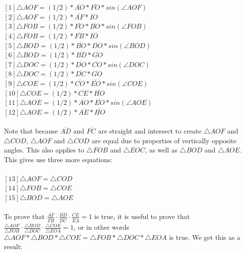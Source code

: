 \begin{Questions}
{  \\
  \\$[1]\triangle AOF = (1/2)*\overline{AO}*\overline{FO}*sin(\angle AOF)$
  \\$[2]\triangle AOF = (1/2)*\overline{AF}*\overline{IO}$
  \\$[3]\triangle FOB = (1/2)*\overline{FO}*\overline{BO}*sin(\angle FOB)$
  \\$[4]\triangle FOB = (1/2)*\overline{FB}*\overline{IO}$
  \\$[5]\triangle BOD = (1/2)*\overline{BO}*\overline{DO}*sin(\angle BOD)$
  \\$[6]\triangle BOD = (1/2)*\overline{BD}*\overline{GO}$  \\$[7]\triangle DOC = (1/2)*\overline{DO}*\overline{CO}*sin(\angle DOC)$
  \\$[8]\triangle DOC = (1/2)*\overline{DC}*\overline{GO}$  \\$[9]\triangle COE = (1/2)*\overline{CO}*\overline{EO}*sin(\angle COE)$
  \\$[10]\triangle COE = (1/2)*\overline{CE}*\overline{HO}$
  \\$[11]\triangle AOE = (1/2)*\overline{AO}*\overline{EO}*sin(\angle AOE)$
  \\$[12]\triangle AOE = (1/2)*\overline{AE}*\overline{HO}$
  \\
  \\Note that because $\overline{AD}$ and $\overline{FC}$ are straight and intersect to create $\triangle AOF$ and $\triangle COD$, $\triangle AOF$ and $\triangle COD$ are equal due to properties of vertically opposite angles. This also applies to $\triangle FOB$ and $\triangle EOC$, as well as $\triangle BOD$ and $\triangle AOE$. This gives use three more equations:
  \\
  \\$[13]\triangle AOF = \triangle COD$
  \\$[14]\triangle FOB = \triangle COE$
  \\$[15]\triangle BOD = \triangle AOE$
  \\
  \\To prove that $\frac{\overline{AF}}{\overline{FB}}\cdot \frac{\overline{BD}}{\overline{  DC}} \cdot \frac{\overline{  CE}}{\overline{  EA}} = 1$ is true, it is useful to prove that $\frac{\triangle AOF}{\triangle FOB}\cdot \frac{\triangle BOD}{\triangle DOC} \cdot \frac{\triangle COE}{\triangle EOA} = 1$, or in other words $\triangle AOF *\triangle BOD * \triangle COE=\triangle FOB*\triangle DOC*\triangle EOA$ is true. We get this as a result:
}
\end{Questions}
